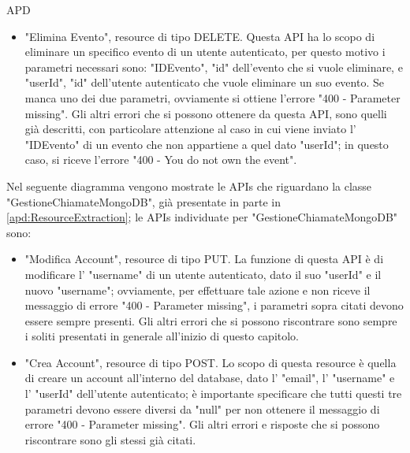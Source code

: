 \begin{listaPersonale} {APD}
\begin{listaPersonale2}[APD]{}
\begin{listaPersonale3}[APD]{}
\begin{itemize}
                \item "Elimina Evento", resource di tipo DELETE. Questa API ha lo scopo di eliminare un specifico evento di un utente autenticato, per questo motivo i parametri necessari sono: "IDEvento", "id" dell'evento che si vuole eliminare, e "userId", "id" dell'utente autenticato che vuole eliminare un suo evento. Se manca uno dei due parametri, ovviamente si ottiene l'errore "400 - Parameter missing". Gli altri errori che si possono ottenere da questa API, sono quelli già descritti, con particolare attenzione al caso in cui viene inviato l' "IDEvento" di un evento che non appartiene a quel dato "userId"; in questo caso, si riceve l'errore "400 - You do not own the event".
            \end{itemize}
            \begin{center}
                
            \end{center}
            Nel seguente diagramma vengono mostrate le APIs che riguardano la classe "GestioneChiamateMongoDB", già presentate in parte in \ref{apd:ResourceExtraction}; le APIs individuate per "GestioneChiamateMongoDB" sono:
            \begin{itemize}
                \item "Modifica Account", resource di tipo PUT. La funzione di questa API è di modificare l' "username" di un utente autenticato, dato il suo "userId" e il nuovo "username"; ovviamente, per effettuare tale azione e non riceve il messaggio di errore "400 - Parameter missing", i parametri sopra citati devono essere sempre presenti. Gli altri errori che si possono riscontrare sono sempre i soliti presentati in generale all'inizio di questo capitolo.
                \item "Crea Account", resource di tipo POST. Lo scopo di questa resource è quella di creare un account all'interno del database, dato l' "email", l' "username" e l' "userId" dell'utente autenticato; è importante specificare che tutti questi tre parametri devono essere diversi da "null" per non ottenere il messaggio di errore "400 - Parameter missing". Gli altri errori e risposte che si possono riscontrare sono gli stessi già citati.

\end{itemize}
\end{listaPersonale3}
\end{listaPersonale2}
\end{listaPersonale}
